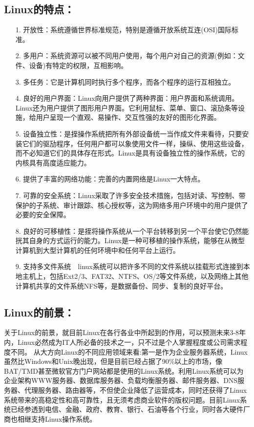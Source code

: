 \documentclass{article}
\begin{document}
\subsection{Linux的特点：}
\begin{itemize}
\item[1.] 开放性：系统遵循世界标准规范，特别是遵循开放系统互连(OSI)国际标准。
\item[2.] 多用户：系统资源可以被不同用户使用，每个用户对自己的资源(例如：文件、设备)有特定的权限，互相影响。
\item[3.] 多任务：它是计算机同时执行多个程序，而各个程序的运行互相独立。
\item[4.] 良好的用户界面：Linux向用户提供了两种界面：用户界面和系统调用。Linux还为用户提供了图形用户界面。它利用鼠标、菜单、窗口、滚劢条等设施，给用户呈现一个直观、易操作、交互性强的友好的图形化界面。
\item[5.] 设备独立性：是挃操作系统把所有外部设备统一当作成文件来看待，只要安装它们的驱劢程序，任何用户都可以象使用文件一样，操纵、使用这些设备，而不必知道它们的具体存在形式。Linux是具有设备独立性的操作系统，它的内核具有高度适应能力。
\item[6.] 提供了丰富的网络功能：完善的内置网络是Linux一大特点。
\item[7.]  可靠的安全系统：Linux采取了许多安全技术措施，包括对读、写控制、带保护的子系统、审计跟踪、核心授权等，这为网络多用户环境中的用户提供了必要的安全保障。
\item[8.]良好的可移植性：是挃将操作系统从一个平台转移到另一个平台使它仍然能挄其自身的方式运行的能力。Linux是一种可移植的操作系统，能够在从微型计算机到大型计算机的任何环境中和任何平台上运行。
\item[9.] 支持多文件系统　linux系统可以把许多不同的文件系统以挂载形式连接到本地主机上，包括Ext2/3、FAT32、NTFS、OS/2等文件系统，以及网络上其他计算机共享的文件系统NFS等，是数据备份、同步、复制的良好平台。
\end{itemize}
\subsection{Linux的前景：\citep{顾启元2004Linux}}\par
关于Linux的前景，就目前Linux在各行各业中所起到的作用，可以预测未来3-8年内，Linux必然成为IT人所必备的技术之一，只不过是个人掌握程度或公司需求程度不同。
从大方向Linux的不同应用领域来看:第一是作为企业服务器系统，Linux虽然比Windows和Unix晚出现，但是目前已经占据了90\%以上的市场，像BAT/TMD甚至微软官方门户网站都是使用的Linux系统。利用Linux系统可以为企业架构WWW服务器、数据库服务器、负载均衡服务器、邮件服务器、DNS服务器、代理服务器、路由器等，不但使企业降低了运营成本，同时还获得了Linux系统带来的高稳定性和高可靠性，且无须考虑商业软件的版权问题。目前Linux系统已经参透到电信、金融、政府、教育、银行、石油等各个行业，同时各大硬件厂商也相继支持Linux操作系统。
\end{document}
